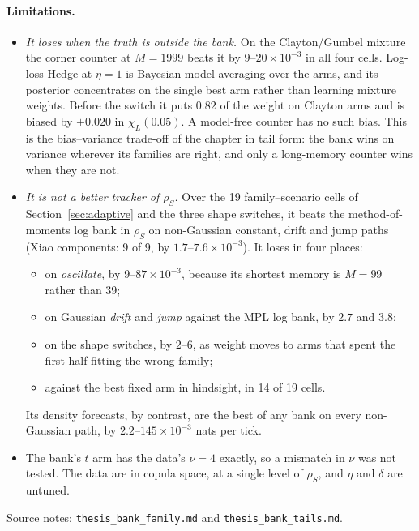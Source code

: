 \paragraph{Limitations.}
\begin{itemize}
  \item \emph{It loses when the truth is outside the bank.} On the Clayton/Gumbel mixture the
    corner counter at $M=1999$ beats it by $9$--$20\times10^{-3}$ in all four cells. Log-loss Hedge
    at $\eta=1$ is Bayesian model averaging over the arms, and its posterior concentrates on the
    single best arm rather than learning mixture weights. Before the switch it puts $0.82$ of the
    weight on Clayton arms and is biased by $+0.020$ in $\chi_L(0.05)$. A model-free counter has no
    such bias. This is the bias--variance trade-off of the chapter in tail form: the bank wins on
    variance wherever its families are right, and only a long-memory counter wins when they are not.
  \item \emph{It is not a better tracker of $\rho_S$.} Over the 19 family--scenario cells of
    Section~\ref{sec:adaptive} and the three shape switches, it beats the method-of-moments log bank
    in $\rho_S$ on non-Gaussian constant, drift and jump paths (Xiao components: 9 of 9, by
    $1.7$--$7.6\times10^{-3}$). It loses in four places:
    \begin{itemize}
      \item on \emph{oscillate}, by $9$--$87\times10^{-3}$, because its shortest memory is $M=99$
        rather than 39;
      \item on Gaussian \emph{drift} and \emph{jump} against the MPL log bank, by $2.7$ and $3.8$;
      \item on the shape switches, by $2$--$6$, as weight moves to arms that spent the first half
        fitting the wrong family;
      \item against the best fixed arm in hindsight, in 14 of 19 cells.
    \end{itemize}
    Its density forecasts, by contrast, are the best of any bank on every non-Gaussian path, by
    $2.2$--$145\times10^{-3}$ nats per tick.
  \item The bank's $t$ arm has the data's $\nu=4$ exactly, so a mismatch in $\nu$ was not tested. The
    data are in copula space, at a single level of $\rho_S$, and $\eta$ and $\delta$ are untuned.
\end{itemize}
Source notes: \texttt{thesis\_bank\_family.md} and \texttt{thesis\_bank\_tails.md}.

